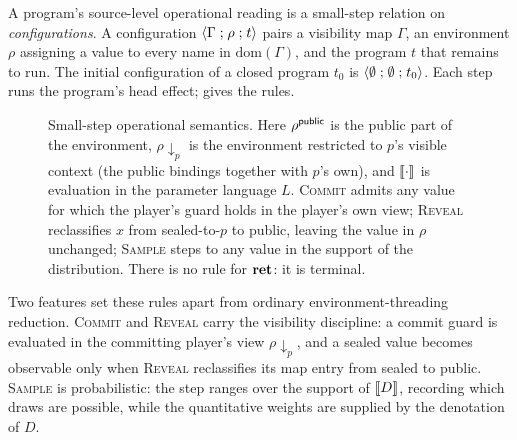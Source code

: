 A program's source-level operational reading is a small-step relation on
\emph{configurations}.  A configuration \(\langle \Gamma \mathrel{;} \rho \mathrel{;} t \rangle\) pairs
a visibility map \(\Gamma\), an environment \(\rho\) assigning a value to
every name in \(\mathrm{dom}(\Gamma)\), and the program \(t\) that
remains to run.  The initial configuration of a closed program \(t_0\) is
\(\langle \emptyset \mathrel{;} \emptyset \mathrel{;} t_0 \rangle\).  Each step runs the program's head
effect;  gives the rules.

\begin{figure}[t]
\centering
{}
\caption{Small-step operational semantics.  Here \(\rho^{\mathsf{public}}\) is the
public part of the environment, \(\rho\!\downarrow_p\) is the environment
restricted to \(p\)'s visible context (the public bindings together with
\(p\)'s own), and \(\llbracket \cdot \rrbracket\) is evaluation in the parameter language
\(L\).  \textsc{Commit} admits any value for which the player's guard
holds in the player's own view; \textsc{Reveal} reclassifies \(x\) from
sealed-to-\(p\) to public, leaving the value in \(\rho\) unchanged;
\textsc{Sample} steps to any value in the support of the distribution.
There is no rule for \(\mathbf{ret}\): it is terminal.}
\label{fig:vegas-sos}
\end{figure}

Two features set these rules apart from ordinary
environment-threading reduction.  \textsc{Commit} and \textsc{Reveal}
carry the visibility discipline: a commit guard is evaluated in the
committing player's view \(\rho\!\downarrow_p\), and a sealed value
becomes observable only when \textsc{Reveal} reclassifies its map entry
from sealed to public.  \textsc{Sample} is probabilistic: the step
ranges over the support of \(\llbracket D \rrbracket\), recording which draws are
possible, while the quantitative weights are supplied by the denotation
of \(D\).

